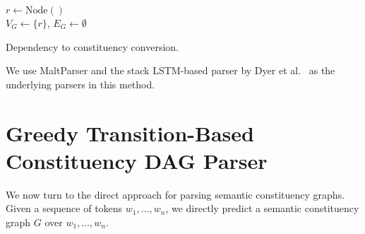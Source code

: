 \documentclass[11pt]{article}
\begin{document}
\begin{algorithm}
 $r \leftarrow \mathrm{Node()}$\\
 $V_G \leftarrow \{r\}$,
 $E_G \leftarrow \emptyset$\\
 \caption{Dependency to constituency conversion.}
 \label{alg:dep2con}
\end{algorithm}

We use MaltParser \cite{nivre2007maltparser} and the stack LSTM-based parser by Dyer et al.~ as the underlying parsers in this method.

\section{Greedy Transition-Based Constituency DAG Parser}\label{sec:direct_approach}

We now turn to the direct approach for parsing semantic constituency graphs. Given a sequence of tokens $w_1, \ldots, w_n$, we directly predict a semantic constituency graph $G$ over $w_1, \ldots, w_n$.

\end{document}
